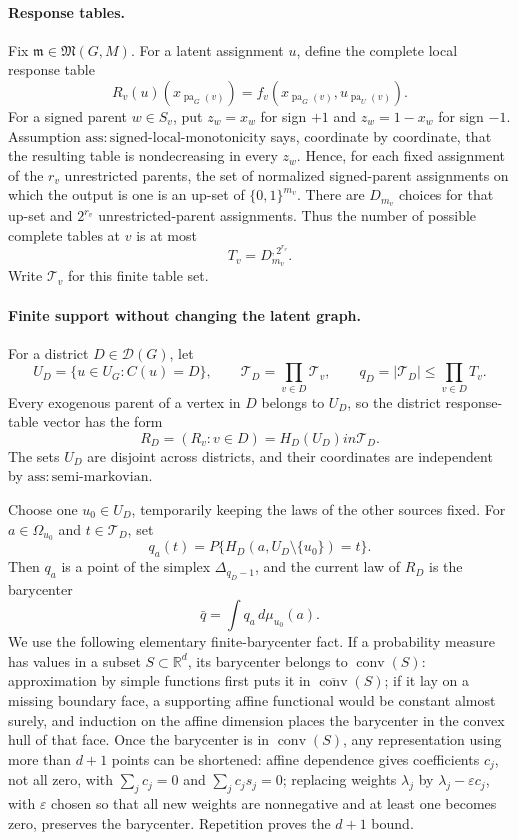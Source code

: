 \paragraph{Response tables.}
Fix \(\mathfrak m\in\mathfrak M(G,M)\).  For a latent assignment \(u\), define the complete local response table
\[
 R_v(u)(x_{\operatorname{pa}_G(v)})
 =f_v(x_{\operatorname{pa}_G(v)},u_{\operatorname{pa}_U(v)}).
\]
For a signed parent \(w\in S_v\), put \(z_w=x_w\) for sign \(+1\) and \(z_w=1-x_w\) for sign \(-1\).  Assumption \(\mathrm{ass:signed\text{-}local\text{-}monotonicity}\) says, coordinate by coordinate, that the resulting table is nondecreasing in every \(z_w\).  Hence, for each fixed assignment of the \(r_v\) unrestricted parents, the set of normalized signed-parent assignments on which the output is one is an up-set of \(\{0,1\}^{m_v}\).  There are \(D_{m_v}\) choices for that up-set and \(2^{r_v}\) unrestricted-parent assignments.  Thus the number of possible complete tables at \(v\) is at most
\[
 T_v=D_{m_v}^{,2^{r_v}}.
\]
Write \(\mathcal T_v\) for this finite table set.

\paragraph{Finite support without changing the latent graph.}
For a district \(D\in\mathcal D(G)\), let
\[
 U_D=\{u\in U_G:C(u)=D\},
 \qquad
 \mathcal T_D=\prod_{v\in D}\mathcal T_v,
 \qquad
 q_D=|\mathcal T_D|\leq\prod_{v\in D}T_v.
\]
Every exogenous parent of a vertex in \(D\) belongs to \(U_D\), so the district response-table vector has the form
\[
 R_D=(R_v:v\in D)=H_D(U_D)in\mathcal T_D.
\]
The sets \(U_D\) are disjoint across districts, and their coordinates are independent by \(\mathrm{ass:semi\text{-}markovian}\).

Choose one \(u_0\in U_D\), temporarily keeping the laws of the other sources fixed.  For \(a\in\Omega_{u_0}\) and \(t\in\mathcal T_D\), set
\[
 q_a(t)
 =P\{H_D(a,U_D\setminus\{u_0\})=t\}.
\]
Then \(q_a\) is a point of the simplex \(\Delta_{q_D-1}\), and the current law of \(R_D\) is the barycenter
\[
 \bar q=\int q_a\,d\mu_{u_0}(a).
\]
We use the following elementary finite-barycenter fact.  If a probability measure has values in a subset \(S\subset\mathbb R^d\), its barycenter belongs to \(\operatorname{conv}(S)\): approximation by simple functions first puts it in \(\overline{\operatorname{conv}}(S)\); if it lay on a missing boundary face, a supporting affine functional would be constant almost surely, and induction on the affine dimension places the barycenter in the convex hull of that face.  Once the barycenter is in \(\operatorname{conv}(S)\), any representation using more than \(d+1\) points can be shortened: affine dependence gives coefficients \(c_j\), not all zero, with \(\sum_jc_j=0\) and \(\sum_jc_js_j=0\); replacing weights \(\lambda_j\) by \(\lambda_j-\varepsilon c_j\), with \(\varepsilon\) chosen so that all new weights are nonnegative and at least one becomes zero, preserves the barycenter.  Repetition proves the \(d+1\) bound.

